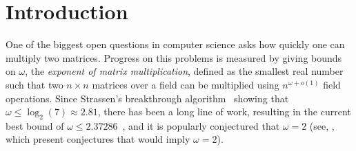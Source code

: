 \documentclass{toc}
\begin{document}
\newcommand{\MOD}[1]{\mathsf{MOD}_#1}
\newcommand{\SYM}{\mathsf{SYM}}
\newcommand{\MAJ}{\mathsf{MAJ}}
\newcommand{\classP}{\mathsf{P}}
\newcommand{\classNP}{\mathsf{NP}}
\newcommand{\THR}{\mathsf{THR}}
\newcommand{\ETHR}{\mathsf{ETHR}}
\newcommand{\AND}{\mathsf{AND}}
\newcommand{\OR}{\mathsf{OR}}
\newcommand{\DOR}{\mathsf{DOR}}
\newcommand{\LEQ}{\mathsf{LEQ}}
\newcommand{\PK}[2]{\mathsf{POL}^{#2}[#1]}
\newcommand{\SETH}{\mathsf{SETH}}
\newcommand{\SAT}{\textsf{SAT}}
\def \MODp {{\sf MODp}}
\def \XOR {\MOD2}
\newcommand{\OV}{\textsf{OV}}
\newcommand{\DISJ}{\textsf{DISJ}}

\newcommand{\poly}{\mathop{\mathrm{poly}}}
\newcommand{\polylog}{\mathop{\mathrm{polylog}}}
\newcommand{\sr}{\mathop{\operatorname{S}}}
\newcommand{\xr}{\mathop{\operatorname{S_x}}}
\newcommand{\yr}{\mathop{\operatorname{S_y}}}
\newcommand{\zr}{\mathop{\operatorname{S_z}}}
\newcommand{\rr}{\mathop{\operatorname{R}}}
\newcommand{\trr}{\mathop{\tilde{\operatorname{R}}}}
\newcommand{\tsr}{\mathop{\tilde{\operatorname{S}}}}
\newcommand{\qr}{\mathop{\operatorname{Q}}}
\newcommand{\tqr}{\mathop{\tilde{\operatorname{Q}}}}

\newcommand{\F}{\mathbb{F}}
%
%
%
%

\newcommand{\eps}{\varepsilon}

%
%
%
%
\newtheorem{observation}[theorem]{Observation}
\newtheorem{property}[theorem]{Property}
%
\newtheorem{counterexample}[theorem]{Counterexample}
\newtheorem{openproblem}[theorem]{Open Problem}
\newtheorem{assumption}[theorem]{Assumption}
%
%
%
\theoremstyle{definition}
%
%
%



\section{Introduction}

One of the biggest open questions in computer science asks how quickly one can multiply two matrices. Progress on this problems is measured by giving bounds on $\omega$, the \emph{exponent of matrix multiplication}, defined as the smallest real number such that two $n \times n$ matrices over a field can be multiplied using $n^{\omega + o(1)}$ field operations. Since Strassen's breakthrough algorithm~\cite{strassen} showing that $\omega \leq \log_2(7) \approx 2.81$, there has been a long line of work, resulting in the current best bound of 
%
$\omega \leq 2.37286$~\cite{v12,legall,awrefined},
and it is popularly conjectured that $\omega=2$ (see, \eg,~\cite{coppersmith,cohn2005group,cohn2013fast,sunfl} which present conjectures that would imply $\omega=2$).
\end{document}
